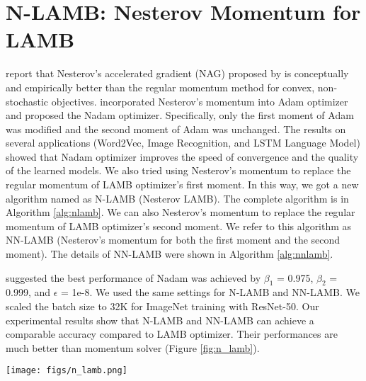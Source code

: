 \documentclass{article} \usepackage{iclr2020_conference,times}
\begin{document}
\section{N-LAMB: Nesterov Momentum for LAMB}

\cite{sutskever2013importance} report that Nesterov’s accelerated gradient (NAG) proposed by \cite{nesterov1983method} is conceptually and empirically better than the regular momentum method for convex, non-stochastic objectives.
\cite{dozat2016incorporating} incorporated Nesterov’s momentum into Adam optimizer and proposed the Nadam optimizer. Specifically, only the first moment of Adam was modified and the second moment of Adam was unchanged. The results on several applications (Word2Vec, Image Recognition, and LSTM Language Model) showed that Nadam optimizer improves the speed of convergence and the quality of the learned models. We also tried using Nesterov’s momentum to replace the regular momentum of LAMB optimizer's first moment. In this way, we got a new algorithm named as N-LAMB (Nesterov LAMB). The complete algorithm is in Algorithm \ref{alg:nlamb}. We can also Nesterov’s momentum to replace the regular momentum of LAMB optimizer's second moment. We refer to this algorithm as NN-LAMB (Nesterov's momentum for both the first moment and the second moment). The details of NN-LAMB were shown in Algorithm \ref{alg:nnlamb}.

\cite{dozat2016incorporating} suggested the best performance of Nadam was achieved by $\beta_1$ = 0.975, $\beta_2$ = 0.999, and $\epsilon$ = 1e-8. We used the same settings for N-LAMB and NN-LAMB. We scaled the batch size to 32K for ImageNet training with ResNet-50. Our experimental results show that N-LAMB and NN-LAMB can achieve a comparable accuracy compared to LAMB optimizer. Their performances are much better than momentum solver (Figure \ref{fig:n_lamb}).

\begin{figure*}[tb]
\vspace{5pt}
\centering
\texttt{[image: figs/n\_lamb.png]}
\caption{This figure shows N-LAMB and NN-LAMB can achieve a comparable accuracy compared to LAMB optimizer. Their performances are much better than momentum solver. The result of momentum optimizer was reported by \cite{goyal2017accurate}. For Nadam, we use the learning rate recipe of \citep{goyal2017accurate}: (1) 5-epoch warmup to stablize the initial stage; and (2) multiply the learning rate by 0.1 at 30th, 60th, and 80th epoch. The target accuracy is around 0.763 \citep{goyal2017accurate}. We also tuned the learning rate of Nadam in \{1e-4, 2e-4, ..., 9e-4, 1e-3, 2e-3, ..., 9e-3, 1e-2\}.}
\label{fig:n_lamb}
\vspace{-10pt}
\end{figure*}
\end{document}
